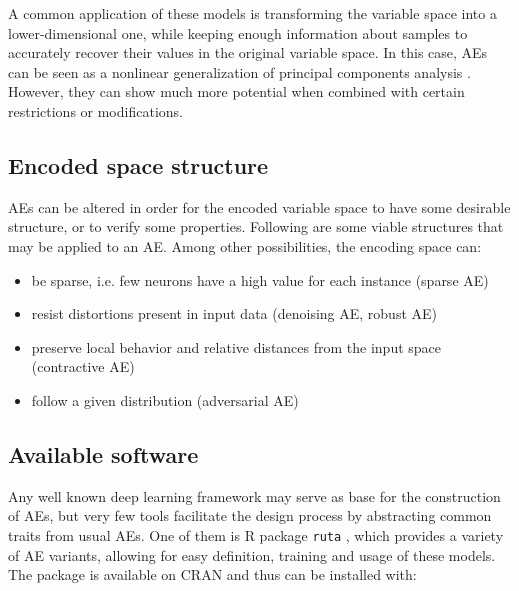 A common application of these models is transforming the variable space into a lower-dimensional one, while keeping enough information about samples to accurately recover their values in the original variable space. In this case, AEs can be seen as a nonlinear generalization of principal components analysis \cite{ANNsPCA}. However, they can show much more potential when combined with certain restrictions or modifications.


\subsection{Encoded space structure}

AEs can be altered in order for the encoded variable space to have some desirable structure, or to verify some properties. Following are some viable structures that may be applied to an AE. Among other possibilities, the encoding space can:  %

\begin{itemize}
    \item be sparse, i.e. few neurons have a high value for each instance (sparse AE)
    \item resist distortions present in input data (denoising AE, robust AE)
    \item preserve local behavior and relative distances from the input space (contractive AE)
    \item follow a given distribution (adversarial AE)
\end{itemize}


\subsection{Available software}

Any well known deep learning framework may serve as base for the construction of AEs, but very few tools facilitate the design process by abstracting common traits from usual AEs. One of them is R package \texttt{ruta} \cite{ruta}, which provides a variety of AE variants, allowing for easy definition, training and usage of these models. The package is available on CRAN and thus can be installed with:

